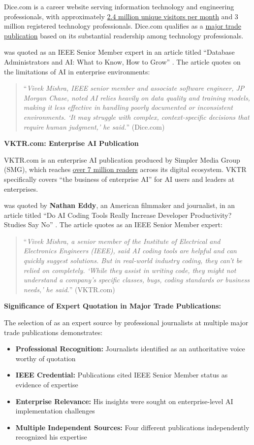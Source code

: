 Dice.com is a career website serving information technology and engineering professionals, with approximately \underline{2.4 million unique visitors per month} and 3 million registered technology professionals. Dice.com qualifies as a \underline{major trade publication} based on its substantial readership among technology professionals.

\dr was quoted as an IEEE Senior Member expert in an article titled ``Database Administrators and AI: What to Know, How to Grow'' \cite{PM11}. The article quotes \dr on the limitations of AI in enterprise environments:

\begin{quote}
``\textit{Vivek Mishra, IEEE senior member and associate software engineer, JP Morgan Chase, noted AI relies heavily on data quality and training models, making it less effective in handling poorly documented or inconsistent environments. `It may struggle with complex, context-specific decisions that require human judgment,' he said.}'' (Dice.com)
\end{quote}

\textbf{VKTR.com: Enterprise AI Publication}

VKTR.com is an enterprise AI publication produced by Simpler Media Group (SMG), which reaches \underline{over 7 million readers} across its digital ecosystem. VKTR specifically covers ``the business of enterprise AI'' for AI users and leaders at enterprises.

\dr was quoted by \textbf{Nathan Eddy}, an American filmmaker and journalist, in an article titled ``Do AI Coding Tools Really Increase Developer Productivity? Studies Say No'' \cite{PM12}. The article quotes \dr as an IEEE Senior Member expert:

\begin{quote}
``\textit{Vivek Mishra, a senior member of the Institute of Electrical and Electronics Engineers (IEEE), said AI coding tools are helpful and can quickly suggest solutions. But in real-world industry coding, they can't be relied on completely. `While they assist in writing code, they might not understand a company's specific classes, bugs, coding standards or business needs,' he said.}'' (VKTR.com)
\end{quote}

\textbf{Significance of Expert Quotation in Major Trade Publications:}

The selection of \dr as an expert source by professional journalists at multiple major trade publications demonstrates:
\begin{itemize}
    \item \textbf{Professional Recognition:} Journalists identified \dr as an authoritative voice worthy of quotation
    \item \textbf{IEEE Credential:} Publications cited \drs IEEE Senior Member status as evidence of expertise
    \item \textbf{Enterprise Relevance:} His insights were sought on enterprise-level AI implementation challenges
    \item \textbf{Multiple Independent Sources:} Four different publications independently recognized his expertise
\end{itemize}

